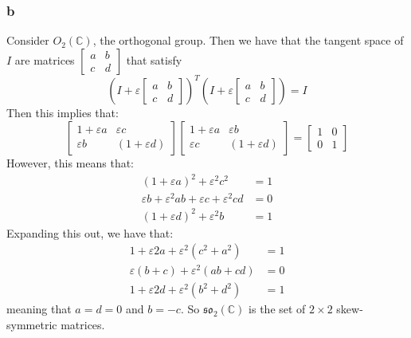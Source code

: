 \documentclass[]{article}
\begin{document}
\subsubsection*{b}
Consider $O_2(\mathbb{C})$, the orthogonal group. Then we have that the tangent space of $I$ are matrices $\begin{bmatrix}
	a & b \\
	c & d
\end{bmatrix}
$
that satisfy 
\begin{equation}
	\left(I + \varepsilon \begin{bmatrix}
		a & b \\
		c & d
	\end{bmatrix}\right)^T 
\left(I + \varepsilon \begin{bmatrix}
	a & b \\
	c & d
\end{bmatrix}\right)
 = I
\end{equation}
Then this implies that:
\begin{equation}
	\begin{bmatrix}
		1 + \varepsilon a & \varepsilon c\\
		\varepsilon b & (1 + \varepsilon d)
	\end{bmatrix}
	\begin{bmatrix}
	1 + \varepsilon a & \varepsilon b\\
	\varepsilon c & (1 + \varepsilon d)
\end{bmatrix}
= 
\begin{bmatrix}
	1 & 0\\
	0 & 1
\end{bmatrix}
\end{equation}
However, this means that:
\begin{align*}
	(1 + \varepsilon a)^2 + \varepsilon^2 c^2 &= 1\\
	\varepsilon b + \varepsilon^2 ab + \varepsilon c + \varepsilon^2 cd &= 0\\
	(1 + \varepsilon d)^2 + \varepsilon^2 b &= 1
\end{align*}
Expanding this out, we have that:
\begin{align*}
	1 + \varepsilon 2a + \varepsilon^2 (c^2 + a^2) &= 1\\
	\varepsilon (b + c) + \varepsilon^2 (ab + cd) &= 0\\
	1 + \varepsilon 2d + \varepsilon^2 (b^2 + d^2) &= 1
\end{align*}
meaning that $a = d = 0$ and $b = -c$. 
So $\mathfrak{so}_2(\mathbb{C})$ is the set of $2 \times 2$ skew-symmetric matrices. 
\end{document}
